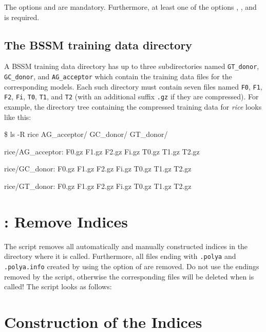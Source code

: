 \documentclass[11pt,a4paper,titlepage]{article}
\begin{document}
The options  and  are mandatory.
Furthermore, at least one of the options , , and  is required.

\subsection{The BSSM training data directory}

A BSSM training data directory has up to three subdirectories named
\texttt{GT\_donor}, \texttt{GC\_donor}, and \texttt{AG\_acceptor} which contain
the training data files for the corresponding models. Each such directory must
contain seven files named \texttt{F0}, \texttt{F1}, \texttt{F2}, \texttt{Fi},
\texttt{T0}, \texttt{T1}, and \texttt{T2} (with an additional suffix \texttt{.gz} if they are compressed). For example, the directory tree containing the compressed training data for \emph{rice} looks like this:

\begin{LargeOutput}
\$ ls -R rice
AG\_acceptor/ GC\_donor/    GT\_donor/

rice/AG\_acceptor:
F0.gz  F1.gz  F2.gz  Fi.gz  T0.gz  T1.gz  T2.gz

rice/GC\_donor:
F0.gz  F1.gz  F2.gz  Fi.gz  T0.gz  T1.gz  T2.gz

rice/GT\_donor:
F0.gz  F1.gz  F2.gz  Fi.gz  T0.gz  T1.gz  T2.gz
\end{LargeOutput}

\section{\Callgthclean: Remove Indices}
\label{Gthcleansection}

The script \Callgthclean removes all automatically and manually constructed
indices in the directory where it is called. Furthermore, all files ending with
\texttt{.polya} and \texttt{.polya.info} created by using the option
 of \Callgth are removed. Do not use the endings
removed by the script, otherwise the corresponding files will be deleted when
\Callgthclean is called! The script looks as follows:

\begin{scriptsize}

\end{scriptsize}



\section{Construction of the Indices}
\label{indexconstruction}
\end{document}

